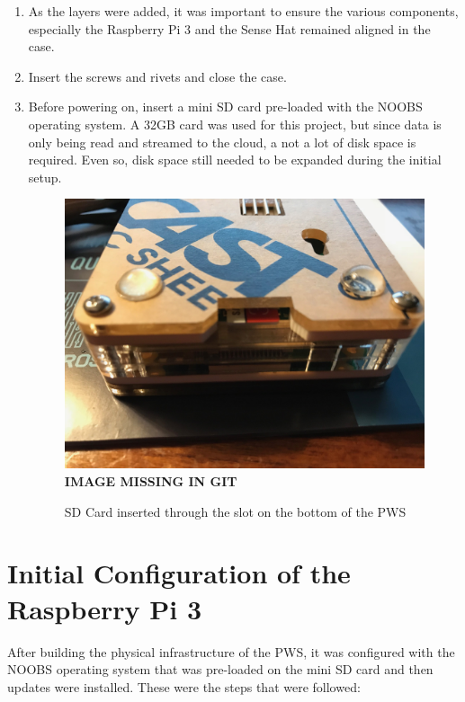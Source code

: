 \documentclass[sigconf]{acmart}
\begin{document}
\begin{enumerate}
\begin{figure}[H]
    \caption{Sense Hat attached to the Raspberry Pi 3 with the Zebra Case assembled upward from the bottom in layers}
\end{figure}
\item As the layers were added, it was important to ensure the various components, especially the Raspberry Pi 3 and the Sense Hat remained aligned in the case.
\item Insert the screws and rivets and close the case.
\item Before powering on, insert a mini SD card pre-loaded with the NOOBS operating system. A 32GB card was used for this project, but since data is only being read and streamed to the cloud, a not a lot of disk space is required. Even so, disk space still needed to be expanded during the initial setup.
\begin{figure}[H]
    \centering
    \includegraphics[width=\columnwidth]{images/Bottom_Case.jpg}
    {\bf IMAGE MISSING IN GIT}
    \caption{SD Card inserted through the slot on the bottom of the PWS}
\end{figure}
\end{enumerate}

\section{Initial Configuration of the Raspberry Pi 3}

After building the physical infrastructure of the PWS, it was configured with the NOOBS operating system that was pre-loaded on the mini SD card and then updates were installed. These were the steps that were followed:
\end{document}
